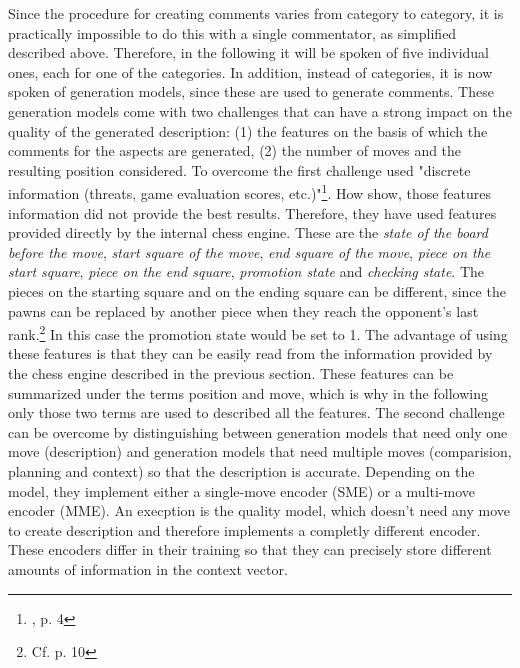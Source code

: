 Since the procedure for creating comments varies from category to category, it is practically impossible to do this with a single commentator, as simplified described above. Therefore, in the following it will be spoken of five individual ones, each for one of the categories. In addition, instead of categories, it is now spoken of generation models, since these are used to generate comments. These generation models come with two challenges that can have a strong impact on the quality of the generated description: (1) the features on the basis of which the comments for the aspects are generated, (2) the number of moves and the resulting position considered. To overcome the first challenge \cite{jhamtani-etal-2018-learning} used "discrete information (threats, game evaluation scores, etc.)"\footnote{\cite{zang-etal-2019-automated}, p. 4}. How \cite{zang-etal-2019-automated} show, those features information did not provide the best results. Therefore, they have used features provided directly by the internal chess engine. These are the \textit{state of the board before the move}, \textit{start square of the move}, \textit{end square of the move}, \textit{piece on the start square}, \textit{piece on the end square}, \textit{promotion state} and  \textit{checking state}. The pieces on the starting square and on the ending square can be different, since the pawns can be replaced by another piece when they reach the opponent's last rank.\footnote{Cf. \cite{fide-2018-loc} p. 10} In this case the promotion state would be set to 1. The advantage of using these features is that they can be easily read from the information provided by the chess engine described in the previous section. These features can be summarized under the terms position and move, which is why in the following only those two terms are used to described all the features. The second challenge can be overcome by distinguishing between generation models that need only one move (description) and generation models that need multiple moves (comparision, planning and context) so that the description is accurate. Depending on the model, they implement either a single-move encoder (SME) or a multi-move encoder (MME). An execption is the quality model, which doesn't need any move to create description and therefore implements a completly different encoder. These encoders differ in their training so that they can precisely store different amounts of information in the context vector.

